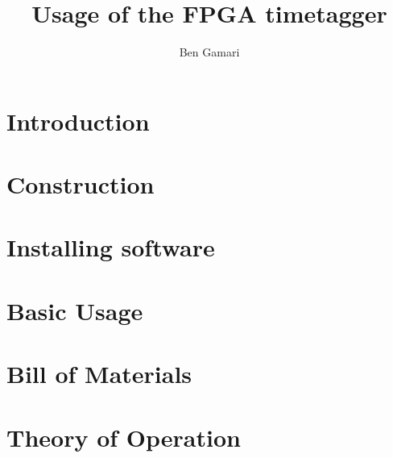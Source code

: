 \documentclass{report}
\begin{document}
\title{Usage of the FPGA timetagger}
\author{Ben Gamari}
\maketitle

\tableofcontents

\chapter{Introduction}


\chapter{Construction}
\label{Ch:Construction}


\chapter{Installing software}
\label{Ch:Installing}


\chapter{Basic Usage}
\label{Ch:BasicUsage}


%

\appendix
\chapter{Bill of Materials}
\label{Ch:BoM}


\chapter{Theory of Operation}
\label{Ch:Theory}

\end{document}
